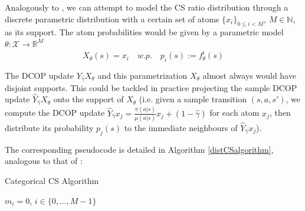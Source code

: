 \documentclass[12pt,a4paper,openright,twoside]{article}
\numberwithin{equation}{section}
\theoremstyle{definition}
\theoremstyle{remark}
\theoremstyle{plain}
\begin{document}
Analogously to \cite{DRL}, we can attempt to model the CS ratio distribution through a discrete parametric distribution with a certain set of atoms $\{x_i\}_{0 \leq i<M}$, $M \in \mathbb{N}$, as its support. The atom probabilities would be given by a parametric model $\theta : \mathcal{X} \rightarrow \mathbb{R}^M$
\begin{equation}
    X_{\theta} (s) = x_i \quad w.p. \quad p_i(s) := f_{\theta}^i(s)
\end{equation}

The DCOP update $Y_{\hat{\gamma}}X_\theta$ and this parametrization $X_\theta$ almost always would have disjoint supports. This could be tackled in practice projecting the sample DCOP update $\hat{Y}_{\hat{\gamma}}X_\theta$ onto the support of $X_\theta$ (i.e. given a sample transition $(s,a,s')$, we compute the DCOP update $\hat{Y}_{\hat{\gamma}}x_j =  \frac{\pi(a|s)}{\mu(a|s)}x_j + (1-\hat{\gamma})$ for each atom $x_j$, then distribute its probability $p_j(s)$ to the immediate neighbours of $\hat{Y}_{\hat{\gamma}}x_j$).

The corresponding pseudocode is detailed in Algorithm \ref{distCSalgorithm}, analogous to that of \cite{DRL}:

\setlength{\algomargin}{1.5em}
\SetAlCapHSkip{0em}
\begin{algorithm}[H]
\caption{Categorical CS Algorithm} \label{distCSalgorithm}
\DontPrintSemicolon
{}
    $m_i = 0$, $i\in \{0,\dots, M-1\}$\;

\end{algorithm}
\end{document}
